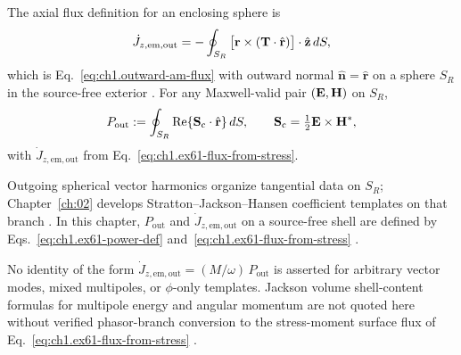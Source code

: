 The axial flux definition for an enclosing sphere is
\begin{equation}
\label{eq:ch1.ex61-flux-from-stress}
\dot J_{z,\mathrm{em,out}}
=-\oint_{S_R}\big[\mathbf{r}\times(\mathbf{T}\cdot\hat{\mathbf{r}})\big]\cdot\hat{\mathbf{z}}\,dS,
\end{equation}
which is Eq.~\eqref{eq:ch1.outward-am-flux} with outward normal $\hat{\mathbf{n}}=\hat{\mathbf{r}}$ on a sphere $S_R$ in the source-free exterior \cite{stratton1941,beth1936}. For any Maxwell-valid pair $(\mathbf{E},\mathbf{H})$ on $S_R$,
\begin{equation}
\label{eq:ch1.ex61-power-def}
P_{\mathrm{out}}:=\oint_{S_R}\Re\{\mathbf{S}_\mathrm{c}\cdot\hat{\mathbf{r}}\}\,dS,\qquad
\mathbf{S}_\mathrm{c}=\tfrac12\mathbf{E}\times\mathbf{H}^*,
\end{equation}
with $\dot J_{z,\mathrm{em,out}}$ from Eq.~\eqref{eq:ch1.ex61-flux-from-stress}.

Outgoing spherical vector harmonics organize tangential data on $S_R$; Chapter~\ref{ch:02} develops Stratton--Jackson--Hansen coefficient templates on that branch \cite{stratton1941,hansen1988,jackson1999}. In this chapter, $P_{\mathrm{out}}$ and $\dot J_{z,\mathrm{em,out}}$ on a source-free shell are defined by Eqs.~\eqref{eq:ch1.ex61-power-def} and~\eqref{eq:ch1.ex61-flux-from-stress} \cite{stratton1941,beth1936}.

\begin{remark}
\label{rem:ch1.hansen-flux-deferred}
No identity of the form $\dot J_{z,\mathrm{em,out}}=(M/\omega)\,P_{\mathrm{out}}$ is asserted for arbitrary vector modes, mixed multipoles, or $\phi$-only templates. Jackson volume shell-content formulas for multipole energy and angular momentum are not quoted here without verified phasor-branch conversion to the stress-moment surface flux of Eq.~\eqref{eq:ch1.ex61-flux-from-stress} \cite{jackson1999,stratton1941}.
\end{remark}


